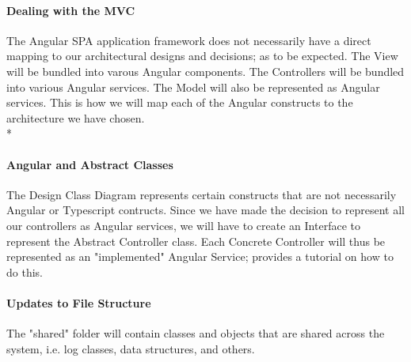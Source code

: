 \documentclass[11pt]{article}
\begin{document}

\paragraph{Dealing with the MVC}
The Angular SPA application framework does not necessarily have a direct mapping to our architectural designs and decisions; as to be expected. The View will be bundled into varous Angular components. The Controllers will be bundled into various Angular services. The Model will also be represented as Angular services. This is how we will map each of the Angular constructs to the architecture we have chosen.\\*

\paragraph{Angular and Abstract Classes}
The Design Class Diagram represents certain constructs that are not necessarily Angular or Typescript contructs. Since we have made the decision to represent all our controllers as Angular services, we will have to create an Interface to represent the Abstract Controller class. Each Concrete Controller will thus be represented as an "implemented" Angular Service; \cite{Website:5} provides a tutorial on how to do this.

\paragraph{Updates to File Structure}
The "shared" folder will contain classes and objects  that are shared across the system, i.e. log classes, data structures, and others.\par
\end{document}
